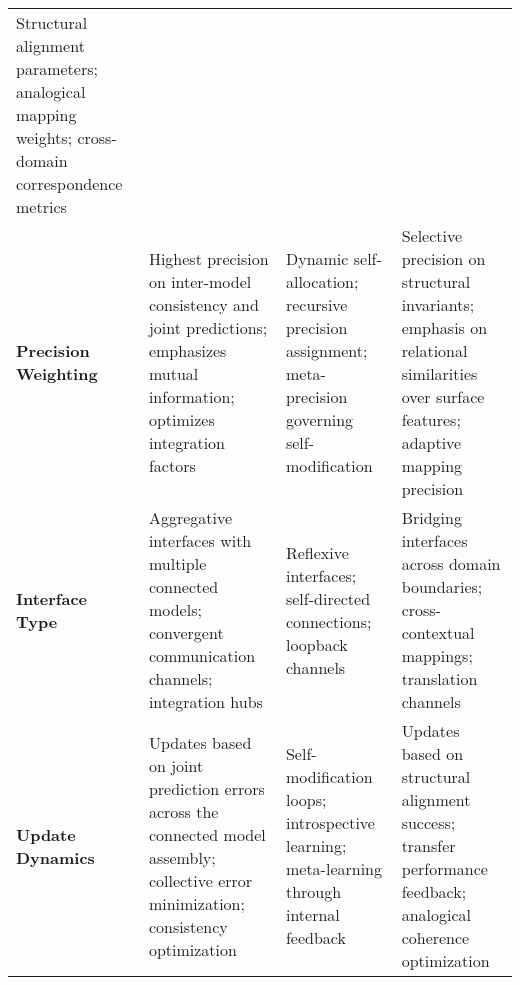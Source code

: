 \begin{longtable}[]{@{}llll@{}}
\begin{minipage}[t]{0.27\columnwidth}
Structural alignment parameters; analogical mapping weights;
cross-domain correspondence metrics\strut
\end{minipage}\tabularnewline
\begin{minipage}[t]{0.11\columnwidth}\raggedright
\textbf{Precision Weighting}\strut
\end{minipage} & \begin{minipage}[t]{0.26\columnwidth}\raggedright
Highest precision on inter-model consistency and joint predictions;
emphasizes mutual information; optimizes integration factors\strut
\end{minipage} & \begin{minipage}[t]{0.24\columnwidth}\raggedright
Dynamic self-allocation; recursive precision assignment; meta-precision
governing self-modification\strut
\end{minipage} & \begin{minipage}[t]{0.27\columnwidth}\raggedright
Selective precision on structural invariants; emphasis on relational
similarities over surface features; adaptive mapping precision\strut
\end{minipage}\tabularnewline
\begin{minipage}[t]{0.11\columnwidth}\raggedright
\textbf{Interface Type}\strut
\end{minipage} & \begin{minipage}[t]{0.26\columnwidth}\raggedright
Aggregative interfaces with multiple connected models; convergent
communication channels; integration hubs\strut
\end{minipage} & \begin{minipage}[t]{0.24\columnwidth}\raggedright
Reflexive interfaces; self-directed connections; loopback channels\strut
\end{minipage} & \begin{minipage}[t]{0.27\columnwidth}\raggedright
Bridging interfaces across domain boundaries; cross-contextual mappings;
translation channels\strut
\end{minipage}\tabularnewline
\begin{minipage}[t]{0.11\columnwidth}\raggedright
\textbf{Update Dynamics}\strut
\end{minipage} & \begin{minipage}[t]{0.26\columnwidth}\raggedright
Updates based on joint prediction errors across the connected model
assembly; collective error minimization; consistency optimization\strut
\end{minipage} & \begin{minipage}[t]{0.24\columnwidth}\raggedright
Self-modification loops; introspective learning; meta-learning through
internal feedback\strut
\end{minipage} & \begin{minipage}[t]{0.27\columnwidth}\raggedright
Updates based on structural alignment success; transfer performance
feedback; analogical coherence optimization\strut
\end{minipage}\tabularnewline
\bottomrule
\end{longtable}

\backmatter





